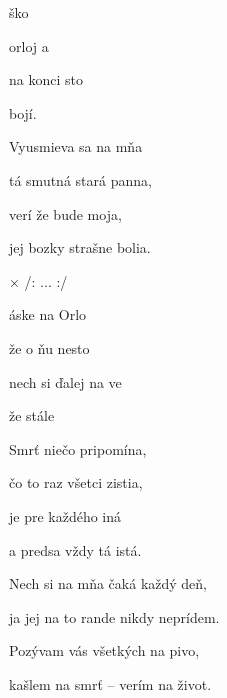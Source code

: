
\zs
{}  ško

orloj a 

na konci  sto

 bojí. 
\ks

\zs
Vyusmieva sa na mňa

tá smutná stará panna,

verí že bude moja,

jej bozky strašne bolia.
\ks

× /: ...      :/

áske na  Orlo

 že o ňu  nesto

nech si ďalej  na ve

 že  stále 
\kr

\zs
Smrť niečo pripomína,

čo to raz všetci zistia,

je pre každého iná

a predsa vždy tá istá.
\ks

\zr \kr

\zr
Nech si na mňa čaká každý deň,

ja jej na to rande nikdy neprídem.

Pozývam vás všetkých na pivo,

kašlem na smrť -- verím na život.
\kr

\kp



